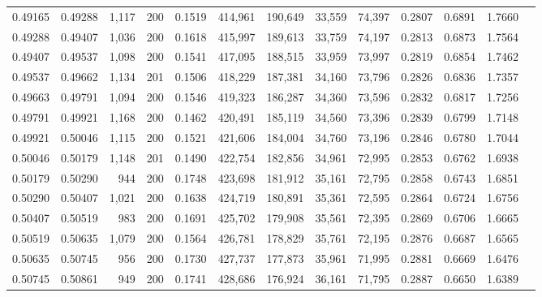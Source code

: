 \begin{tabular}{rrrrrrrrrrrrr}
0.49165 & 0.49288 &  1,117 & 200 &                                     0.1519 & 414,961 & 190,649 &  33,559 &  74,397 & 0.2807 & 0.6891 & 1.7660 \\
0.49288 & 0.49407 &  1,036 & 200 &                                     0.1618 & 415,997 & 189,613 &  33,759 &  74,197 & 0.2813 & 0.6873 & 1.7564 \\
0.49407 & 0.49537 &  1,098 & 200 &                                     0.1541 & 417,095 & 188,515 &  33,959 &  73,997 & 0.2819 & 0.6854 & 1.7462 \\
0.49537 & 0.49662 &  1,134 & 201 &                                     0.1506 & 418,229 & 187,381 &  34,160 &  73,796 & 0.2826 & 0.6836 & 1.7357 \\
0.49663 & 0.49791 &  1,094 & 200 &                                     0.1546 & 419,323 & 186,287 &  34,360 &  73,596 & 0.2832 & 0.6817 & 1.7256 \\
0.49791 & 0.49921 &  1,168 & 200 &                                     0.1462 & 420,491 & 185,119 &  34,560 &  73,396 & 0.2839 & 0.6799 & 1.7148 \\
0.49921 & 0.50046 &  1,115 & 200 &                                     0.1521 & 421,606 & 184,004 &  34,760 &  73,196 & 0.2846 & 0.6780 & 1.7044 \\
0.50046 & 0.50179 &  1,148 & 201 &                                     0.1490 & 422,754 & 182,856 &  34,961 &  72,995 & 0.2853 & 0.6762 & 1.6938 \\
0.50179 & 0.50290 &    944 & 200 &                                     0.1748 & 423,698 & 181,912 &  35,161 &  72,795 & 0.2858 & 0.6743 & 1.6851 \\
0.50290 & 0.50407 &  1,021 & 200 &                                     0.1638 & 424,719 & 180,891 &  35,361 &  72,595 & 0.2864 & 0.6724 & 1.6756 \\
0.50407 & 0.50519 &    983 & 200 &                                     0.1691 & 425,702 & 179,908 &  35,561 &  72,395 & 0.2869 & 0.6706 & 1.6665 \\
0.50519 & 0.50635 &  1,079 & 200 &                                     0.1564 & 426,781 & 178,829 &  35,761 &  72,195 & 0.2876 & 0.6687 & 1.6565 \\
0.50635 & 0.50745 &    956 & 200 &                                     0.1730 & 427,737 & 177,873 &  35,961 &  71,995 & 0.2881 & 0.6669 & 1.6476 \\
0.50745 & 0.50861 &    949 & 200 &                                     0.1741 & 428,686 & 176,924 &  36,161 &  71,795 & 0.2887 & 0.6650 & 1.6389 \\

\end{tabular}

